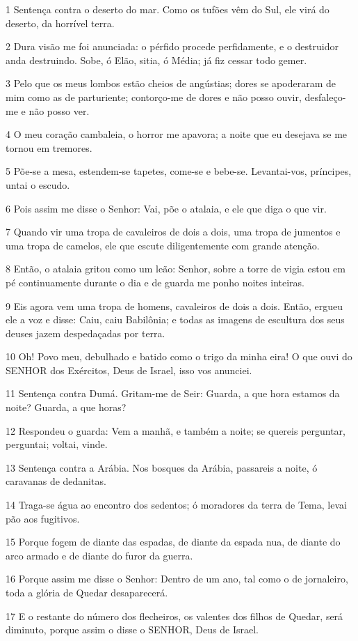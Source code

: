 \par 1 Sentença contra o deserto do mar. Como os tufões vêm do Sul, ele virá do deserto, da horrível terra.
\par 2 Dura visão me foi anunciada: o pérfido procede perfidamente, e o destruidor anda destruindo. Sobe, ó Elão, sitia, ó Média; já fiz cessar todo gemer.
\par 3 Pelo que os meus lombos estão cheios de angústias; dores se apoderaram de mim como as de parturiente; contorço-me de dores e não posso ouvir, desfaleço-me e não posso ver.
\par 4 O meu coração cambaleia, o horror me apavora; a noite que eu desejava se me tornou em tremores.
\par 5 Põe-se a mesa, estendem-se tapetes, come-se e bebe-se. Levantai-vos, príncipes, untai o escudo.
\par 6 Pois assim me disse o Senhor: Vai, põe o atalaia, e ele que diga o que vir.
\par 7 Quando vir uma tropa de cavaleiros de dois a dois, uma tropa de jumentos e uma tropa de camelos, ele que escute diligentemente com grande atenção.
\par 8 Então, o atalaia gritou como um leão: Senhor, sobre a torre de vigia estou em pé continuamente durante o dia e de guarda me ponho noites inteiras.
\par 9 Eis agora vem uma tropa de homens, cavaleiros de dois a dois. Então, ergueu ele a voz e disse: Caiu, caiu Babilônia; e todas as imagens de escultura dos seus deuses jazem despedaçadas por terra.
\par 10 Oh! Povo meu, debulhado e batido como o trigo da minha eira! O que ouvi do SENHOR dos Exércitos, Deus de Israel, isso vos anunciei.
\par 11 Sentença contra Dumá. Gritam-me de Seir: Guarda, a que hora estamos da noite? Guarda, a que horas?
\par 12 Respondeu o guarda: Vem a manhã, e também a noite; se quereis perguntar, perguntai; voltai, vinde.
\par 13 Sentença contra a Arábia. Nos bosques da Arábia, passareis a noite, ó caravanas de dedanitas.
\par 14 Traga-se água ao encontro dos sedentos; ó moradores da terra de Tema, levai pão aos fugitivos.
\par 15 Porque fogem de diante das espadas, de diante da espada nua, de diante do arco armado e de diante do furor da guerra.
\par 16 Porque assim me disse o Senhor: Dentro de um ano, tal como o de jornaleiro, toda a glória de Quedar desaparecerá.
\par 17 E o restante do número dos flecheiros, os valentes dos filhos de Quedar, será diminuto, porque assim o disse o SENHOR, Deus de Israel.

